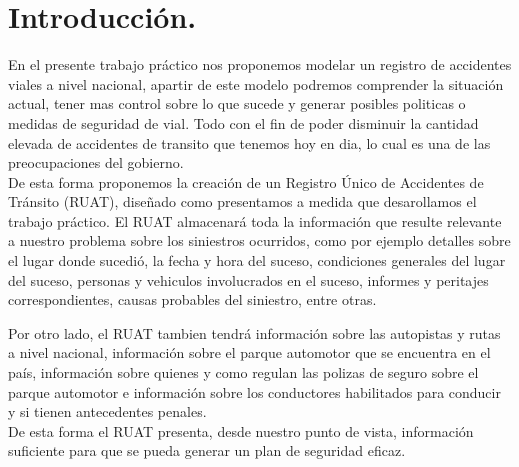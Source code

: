 \section{Introducción.}

En el presente trabajo práctico nos proponemos modelar un registro de accidentes viales a nivel nacional, apartir de este modelo podremos comprender la situación actual, tener mas control sobre lo que sucede y generar posibles politicas o medidas de seguridad de vial. Todo con el fin de poder disminuir la cantidad elevada de accidentes de transito que tenemos hoy en dia, lo cual es una de las preocupaciones del gobierno.\\

De esta forma proponemos la creación de un Registro Único de Accidentes de Tránsito (RUAT), diseñado como presentamos a medida que desarollamos el trabajo práctico. El RUAT almacenará toda la información que resulte relevante a nuestro problema sobre los siniestros ocurridos, como por ejemplo detalles sobre el lugar donde sucedió, la fecha y hora del suceso, condiciones generales del lugar del suceso, personas y vehiculos involucrados en el suceso, informes y peritajes correspondientes, causas probables del siniestro, entre otras.

Por otro lado, el RUAT tambien tendrá información sobre las autopistas y rutas a nivel nacional, información sobre el parque automotor que se encuentra en el país, información sobre quienes y como regulan las polizas de seguro sobre el parque automotor e información sobre los conductores habilitados para conducir y si tienen antecedentes penales.\\

De esta forma el RUAT presenta, desde nuestro punto de vista, información suficiente para que se pueda generar un plan de seguridad eficaz.